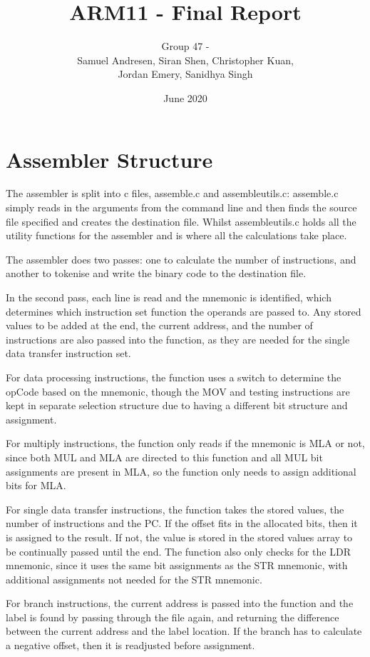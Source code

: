 \documentclass{article}
\title{ARM11 - Final Report}
\author{Group 47 - \\
Samuel Andresen, Siran Shen, Christopher Kuan, \\
Jordan Emery, Sanidhya Singh}
\date{June 2020}
\begin{document}
\maketitle

\section*{Assembler Structure}
The assembler is split into c files, assemble.c and assembleutils.c: assemble.c simply reads in the arguments from the command line and then finds the source file specified and creates the destination file. Whilst assembleutils.c holds all the utility functions for the assembler and is where all the calculations take place.

The assembler does two passes: one to calculate the number of instructions, and another to tokenise and write the binary code to the destination file.

In the second pass, each line is read and the mnemonic is identified, which determines which instruction set function the operands are passed to. Any stored values to be added at the end, the current address, and the number of instructions are also passed into the function, as they are needed for the single data transfer instruction set.

For data processing instructions, the function uses a switch to determine the opCode based on the mnemonic, though the MOV and testing instructions are kept in separate selection structure due to having a different bit structure and assignment. 

For multiply instructions, the function only reads if the mnemonic is MLA or not, since both MUL and MLA are directed to this function and all MUL bit assignments are present in MLA, so the function only needs to assign additional bits for MLA.

For single data transfer instructions, the function takes the stored values, the number of instructions and the PC. If the offset fits in the allocated bits, then it is assigned to the result. If not, the value is stored in the stored values array to be continually passed until the end. The function also only checks for the LDR mnemonic, since it uses the same bit assignments as the STR mnemonic, with additional assignments not needed for the STR mnemonic.

For branch instructions, the current address is passed into the function and the label is found by passing through the file again, and returning the difference between the current address and the label location. If the branch has to calculate a negative offset, then it is readjusted before assignment.
\end{document}

